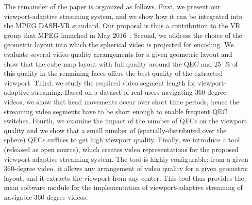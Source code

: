 The remainder of the paper is organized as follows. First, we
present our viewport-adaptive streaming
system, and
we show how it can be integrated into
the \ac{MPEG} \ac{DASH}-VR standard. Our proposal is thus a contribution
to the \ac{VR} group that \ac{MPEG} launched in May
$2016$~\cite{mpeg-vr}. Second, we address the choice of the geometric
layout into which the spherical video is projected for
encoding. We evaluate several video quality arrangements for a given
geometric layout and show that the cube map layout with full quality around the \ac{QEC} and \SI{25}{\percent} of this quality in the remaining faces offers the best quality of the extracted viewport.
Third, we study the required video segment length for
viewport-adaptive streaming. Based on a dataset of real users
navigating $360$-degree videos, we show that head movements occur over
short time periods, hence the streaming video segments have to be
short enough to enable frequent \ac{QEC} switches. Fourth, we
examine the impact of the number of \acp{QEC} on the viewport quality
and we show that a small number of (spatially-distributed over the sphere)
\acp{QEC} suffices to get high viewport quality.
Finally, we introduce a tool (released as open source), which creates video representations for the proposed viewport-adaptive streaming system.
The tool is highly configurable: from a given
$360$-degree video, it allows any arrangement of video quality for a
given geometric layout, and it extracts the viewport from any \FoV{} center.
This tool thus provides the main software module
for the implementation of viewport-adaptive streaming of navigable
$360$-degree videos.

